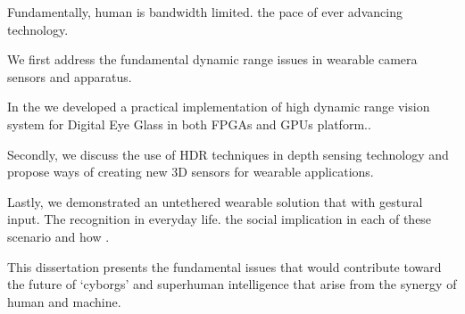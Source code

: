 Fundamentally, human is bandwidth limited.  the pace of ever advancing technology.  

We first address the fundamental dynamic range issues in wearable camera sensors and apparatus. 
 
In the we developed a practical implementation of high dynamic range vision system for Digital Eye Glass in both FPGAs and GPUs platform.. 
 
Secondly, we discuss the use of HDR techniques in depth sensing technology and propose ways of creating new 3D sensors for wearable applications. 
 
Lastly, we demonstrated an untethered wearable solution that with gestural input. The recognition in everyday life. the social implication in each of these scenario and how . 

This dissertation presents the fundamental issues that would contribute toward the future of `cyborgs' and superhuman intelligence that arise from the synergy of human and machine. 


